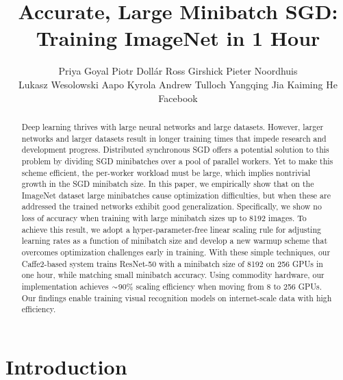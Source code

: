 \documentclass[10pt,twocolumn,letterpaper]{article}
\newcommand{\app}{\raise.17ex\hbox{$\scriptstyle\sim$}}
\begin{document}
\title{Accurate, Large Minibatch SGD:\\Training ImageNet in 1 Hour\vspace{-3mm}}

\author{
 Priya Goyal \qquad Piotr Doll\'ar \qquad Ross Girshick \qquad Pieter Noordhuis \\
 \quad Lukasz Wesolowski \quad Aapo Kyrola \quad Andrew Tulloch
 \quad Yangqing Jia \quad Kaiming He\vspace{4mm}\\
 Facebook\vspace{-1mm}
}

\maketitle

\begin{abstract}
Deep learning thrives with large neural networks and large datasets. However, larger networks and larger datasets result in longer training times that impede research and development progress. Distributed synchronous SGD offers a potential solution to this problem by dividing SGD minibatches over a pool of parallel workers. Yet to make this scheme efficient, the per-worker workload must be large, which implies nontrivial growth in the SGD minibatch size. In this paper, we empirically show that on the ImageNet dataset large minibatches cause optimization difficulties, but when these are addressed the trained networks exhibit good generalization. Specifically, we show no loss of accuracy when training with large minibatch sizes up to 8192 images. To achieve this result, we adopt a hyper-parameter-free linear scaling rule for adjusting learning rates as a function of minibatch size and develop a new warmup scheme that overcomes optimization challenges early in training. With these simple techniques, our Caffe2-based system trains ResNet-50 with a minibatch size of 8192 on 256 GPUs in one hour, while matching small minibatch accuracy. Using commodity hardware, our implementation achieves $\app$90\% scaling efficiency when moving from 8 to 256 GPUs. Our findings enable training visual recognition models on internet-scale data with high efficiency.
\end{abstract}

\section{Introduction}
\end{document}
